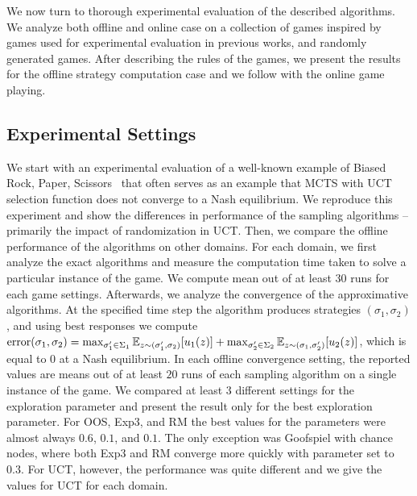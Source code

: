 
We now turn to thorough experimental evaluation of the described algorithms.
We analyze both offline and online case on a collection of games inspired by games used for experimental evaluation in previous works, and randomly generated games.
After describing the rules of the games, we present the results for the offline strategy computation case and we follow with the online game playing.

\subsection{Experimental Settings}


We start with an experimental evaluation of a well-known example of Biased Rock, Paper, Scissors~\cite{Shafiei09} that often serves
as an example that MCTS with UCT selection function does not converge to a Nash equilibrium.
We reproduce this experiment and show the differences in performance of the sampling algorithms -- primarily the impact of randomization in UCT.
Then, we compare the offline performance of the algorithms on other domains.
For each domain, we first analyze the exact algorithms and measure the computation time taken to solve a particular instance of the game. 
We compute mean out of at least $30$ runs for each game settings. 
Afterwards, we analyze the convergence of the approximative algorithms.
At the specified time step the algorithm produces strategies $(\sigma_1,\sigma_2)$, and using best responses we compute 
$\textrm{error}(\sigma_1,\sigma_2) = \max_{\sigma_1' \in \Sigma_1} \mathbb{E}_{z \sim (\sigma_1',\sigma_2)}[u_1(z)] 
                                   + \max_{\sigma_2' \in \Sigma_2} \mathbb{E}_{z \sim (\sigma_1,\sigma_2')}[u_2(z)]$, 
which is equal to $0$ at a Nash equilibrium.
In each offline convergence setting, the reported values are means out of at least $20$ runs of each sampling algorithm on a single instance of the game.
We compared at least $3$ different settings for the exploration parameter and present the result only for the best exploration parameter.
For OOS, Exp3, and RM the best values for the parameters were almost always $0.6$, $0.1$, and $0.1$.
The only exception was Goofspiel with chance nodes, where both Exp3 and RM converge more quickly with parameter set to $0.3$.
For UCT, however, the performance was quite different and we give the values for UCT for each domain.

